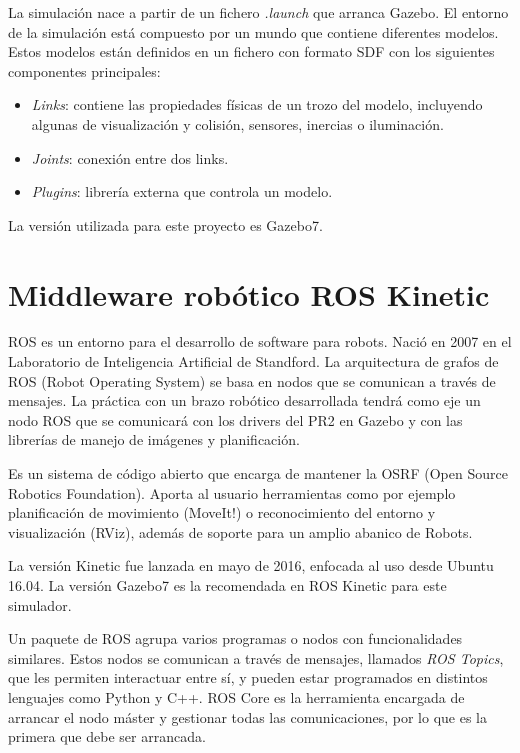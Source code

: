 \documentclass[12pt,spanish,chapterprefix, numbers=noenddot]{book}
\numberwithin{equation}{section}
\numberwithin{figure}{section}
\begin{document}
La simulación nace a partir de un fichero \textit{.launch} que arranca Gazebo. El entorno de la simulación está compuesto por un mundo que contiene diferentes modelos. Estos modelos están definidos en un fichero con formato SDF con los siguientes componentes principales:

\begin{itemize}
\item \textit{Links}: contiene las propiedades físicas de un trozo del modelo, incluyendo algunas de visualización y colisión, sensores, inercias o iluminación.
\item \textit{Joints}: conexión entre dos links.
\item \textit{Plugins}: librería externa que controla un modelo. 
\end{itemize}

La versión utilizada para este proyecto es Gazebo7.

\section{Middleware robótico ROS Kinetic}
ROS es un entorno para el desarrollo de software para robots. Nació en 2007 en el Laboratorio de Inteligencia Artificial de Standford. La arquitectura de grafos de ROS (Robot Operating System) se basa en nodos que se comunican a través de mensajes. La práctica con un brazo robótico desarrollada tendrá como eje un nodo ROS que se comunicará con los drivers del PR2 en Gazebo y con las librerías de manejo de imágenes y planificación. 

Es un sistema de código abierto que encarga de mantener la OSRF (Open Source Robotics Foundation). Aporta al usuario herramientas como por ejemplo planificación de movimiento (MoveIt!) o reconocimiento del entorno y visualización (RViz), además de soporte para un amplio abanico de Robots. 

La versión Kinetic fue lanzada en mayo de 2016, enfocada al uso desde Ubuntu 16.04. La versión Gazebo7 es la recomendada en ROS Kinetic para este simulador. 

Un paquete de ROS agrupa varios programas o nodos con funcionalidades similares. Estos nodos se comunican  a través de mensajes, llamados \textit{ROS Topics}, que les permiten interactuar entre sí, y pueden estar programados en distintos lenguajes como Python y C++.
ROS Core es la herramienta encargada de arrancar el nodo máster y gestionar todas las comunicaciones, por lo que es la primera que debe ser arrancada. 
\end{document}
